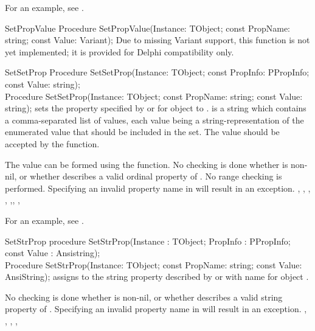 For an example, see .


\begin{procedure}{SetPropValue}
\Declaration
Procedure SetPropValue(Instance: TObject; 
                       const PropName: string; const Value: Variant);                   
\Description
Due to missing Variant support, this function is not yet implemented;
it is provided for Delphi compatibility only.
\Errors
\SeeAlso
\end{procedure}

\begin{procedure}{SetSetProp}
\Declaration
Procedure SetSetProp(Instance: TObject; 
                     const PropInfo: PPropInfo; const Value: string);\\
Procedure SetSetProp(Instance: TObject;
                     const PropName: string; const Value: string);                      
\Description
{} sets the property specified by  or
 for object  to .  is a
string which contains a comma-separated list of values, each value being a
string-representation of the enumerated value that should be included in
the set. The value should be accepted by the  function.

The value can be formed using the  function.
\Errors
No checking is done whether  is non-nil, or whether
 describes a valid ordinal property of .
No range checking is performed.
Specifying an invalid property name in  will result in an
 exception.                                                 
\SeeAlso
{}, , , ,
,, ,
\end{procedure}

For an example, see .

\begin{procedure}{SetStrProp}
\Declaration
procedure SetStrProp(Instance : TObject; PropInfo : PPropInfo; 
                     const Value : Ansistring);\\
Procedure SetStrProp(Instance: TObject; const PropName: string; 
                     const Value: AnsiString);
\Description
{} assigns  to the string property described by
 or with name  for object . 

\Errors
No checking is done whether  is non-nil, or whether
 describes a valid string property of .
Specifying an invalid property name in  will result in an
 exception.
\SeeAlso
{}, , ,
,
\end{procedure}

